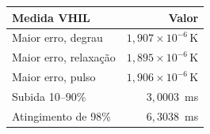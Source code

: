 \begin{tabular}{lr}\toprule
Medida VHIL & Valor \\ \midrule
Maior erro, degrau & $1{,}907\times10^{-6}\,\mathrm{K}$ \\ 
Maior erro, relaxa\c{c}\~ao & $1{,}895\times10^{-6}\,\mathrm{K}$ \\ 
Maior erro, pulso & $1{,}906\times10^{-6}\,\mathrm{K}$ \\ 
Subida 10--90\% & $3{,}0003$~ms \\ 
Atingimento de 98\% & $6{,}3038$~ms \\ 
\bottomrule\end{tabular}
